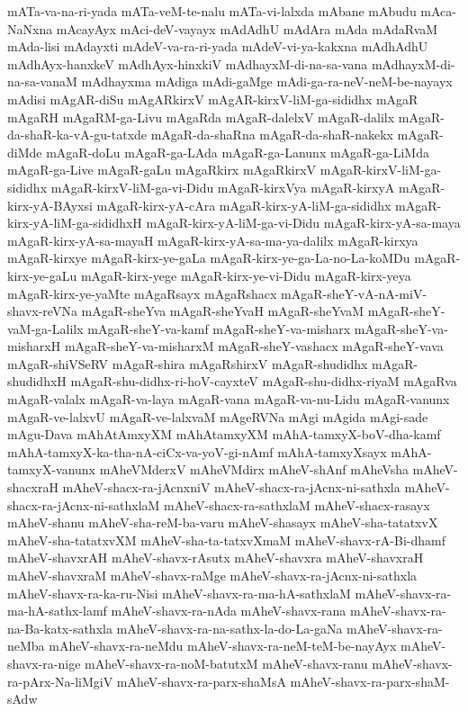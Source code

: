 {mATa-va-na-ri-yada
mATa-veM-te-nalu
mATa-vi-lalxda
mAbane
mAbudu
mAca-NaNxna
mAcayAyx
mAci-deV-vayayx
mAdAdhU
mAdAra
mAda
mAdaRvaM
mAda-lisi
mAdayxti
mAdeV-va-ra-ri-yada
mAdeV-vi-ya-kakxna
mAdhAdhU
mAdhAyx-hanxkeV
mAdhAyx-hinxkiV
mAdhayxM-di-na-sa-vana
mAdhayxM-di-na-sa-vanaM
mAdhayxma
mAdiga
mAdi-gaMge
mAdi-ga-ra-neV-neM-be-nayayx
mAdisi
mAgAR-diSu
mAgARkirxV
mAgAR-kirxV-liM-ga-sididhx
mAgaR
mAgaRH
mAgaRM-ga-Livu
mAgaRda
mAgaR-dalelxV
mAgaR-dalilx
mAgaR-da-shaR-ka-vA-gu-tatxde
mAgaR-da-shaRna
mAgaR-da-shaR-nakekx
mAgaR-diMde
mAgaR-doLu
mAgaR-ga-LAda
mAgaR-ga-Lanunx
mAgaR-ga-LiMda
mAgaR-ga-Live
mAgaR-gaLu
mAgaRkirx
mAgaRkirxV
mAgaR-kirxV-liM-ga-sididhx
mAgaR-kirxV-liM-ga-vi-Didu
mAgaR-kirxVya
mAgaR-kirxyA
mAgaR-kirx-yA-BAyxsi
mAgaR-kirx-yA-cAra
mAgaR-kirx-yA-liM-ga-sididhx
mAgaR-kirx-yA-liM-ga-sididhxH
mAgaR-kirx-yA-liM-ga-vi-Didu
mAgaR-kirx-yA-sa-maya
mAgaR-kirx-yA-sa-mayaH
mAgaR-kirx-yA-sa-ma-ya-dalilx
mAgaR-kirxya
mAgaR-kirxye
mAgaR-kirx-ye-gaLa
mAgaR-kirx-ye-ga-La-no-La-koMDu
mAgaR-kirx-ye-gaLu
mAgaR-kirx-yege
mAgaR-kirx-ye-vi-Didu
mAgaR-kirx-yeya
mAgaR-kirx-ye-yaMte
mAgaRsayx
mAgaRshacx
mAgaR-sheY-vA-nA-miV-shavx-reVNa
mAgaR-sheYva
mAgaR-sheYvaH
mAgaR-sheYvaM
mAgaR-sheY-vaM-ga-Lalilx
mAgaR-sheY-va-kamf
mAgaR-sheY-va-misharx
mAgaR-sheY-va-misharxH
mAgaR-sheY-va-misharxM
mAgaR-sheY-vashacx
mAgaR-sheY-vava
mAgaR-shiVSeRV
mAgaR-shira
mAgaRshirxV
mAgaR-shudidhx
mAgaR-shudidhxH
mAgaR-shu-didhx-ri-hoV-cayxteV
mAgaR-shu-didhx-riyaM
mAgaRva
mAgaR-valalx
mAgaR-va-laya
mAgaR-vana
mAgaR-va-nu-Lidu
mAgaR-vanunx
mAgaR-ve-lalxvU
mAgaR-ve-lalxvaM
mAgeRVNa
mAgi
mAgida
mAgi-sade
mAgu-Dava
mAhAtAmxyXM
mAhAtamxyXM
mAhA-tamxyX-boV-dha-kamf
mAhA-tamxyX-ka-tha-nA-ciCx-va-yoV-gi-nAmf
mAhA-tamxyXsayx
mAhA-tamxyX-vanunx
mAheVMderxV
mAheVMdirx
mAheV-shAnf
mAheVsha
mAheV-shacxraH
mAheV-shacx-ra-jAcnxniV
mAheV-shacx-ra-jAcnx-ni-sathxla
mAheV-shacx-ra-jAcnx-ni-sathxlaM
mAheV-shacx-ra-sathxlaM
mAheV-shacx-rasayx
mAheV-shanu
mAheV-sha-reM-ba-varu
mAheV-shasayx
mAheV-sha-tatatxvX
mAheV-sha-tatatxvXM
mAheV-sha-ta-tatxvXmaM
mAheV-shavx-rA-Bi-dhamf
mAheV-shavxrAH
mAheV-shavx-rAsutx
mAheV-shavxra
mAheV-shavxraH
mAheV-shavxraM
mAheV-shavx-raMge
mAheV-shavx-ra-jAcnx-ni-sathxla
mAheV-shavx-ra-ka-ru-Nisi
mAheV-shavx-ra-ma-hA-sathxlaM
mAheV-shavx-ra-ma-hA-sathx-lamf
mAheV-shavx-ra-nAda
mAheV-shavx-rana
mAheV-shavx-ra-na-Ba-katx-sathxla
mAheV-shavx-ra-na-sathx-la-do-La-gaNa
mAheV-shavx-ra-neMba
mAheV-shavx-ra-neMdu
mAheV-shavx-ra-neM-teM-be-nayAyx
mAheV-shavx-ra-nige
mAheV-shavx-ra-noM-batutxM
mAheV-shavx-ranu
mAheV-shavx-ra-pArx-Na-liMgiV
mAheV-shavx-ra-parx-shaMsA
mAheV-shavx-ra-parx-shaM-sAdw
}
